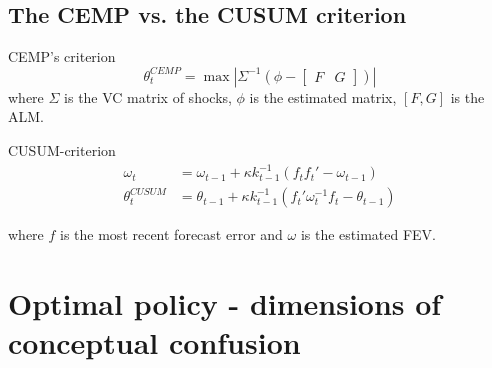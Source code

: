 \documentclass[11pt]{article}
\renewcommand{\[}{\begin{equation}}
\renewcommand{\]}{\end{equation}}
\begin{document}
\subsection{The CEMP vs. the CUSUM criterion}

CEMP's criterion  
\begin{equation}
\theta_t^{CEMP} = \max | \Sigma^{-1} ( \phi - \begin{bmatrix} F & G \end{bmatrix}) |
\end{equation}
where $\Sigma$ is the VC matrix of shocks, $\phi$ is the estimated matrix, $[F,G]$ is the ALM.

\noindent CUSUM-criterion
\begin{align}
\omega_t & =  \omega_{t-1} + \kappa k_{t-1}^{-1}(f_t f_t'  -\omega_{t-1})\\
\theta_t^{CUSUM} & =  \theta_{t-1} + \kappa k_{t-1}^{-1}(f_t'\omega_t^{-1}f_t -\theta_{t-1})
\end{align}

where $f$ is the most recent forecast error and $\omega$ is the estimated FEV. 

\newpage
\section{Optimal policy - dimensions of conceptual confusion}
\end{document}
